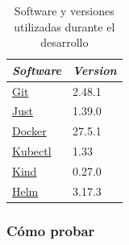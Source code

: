 \begin{table}
  \centering
  \begin{tabular}{|l|l|}
    \hline
    \textit{Software} & \textit{Version} \\ \hline
    \href{https://git-scm.com/book/en/v2/Getting-Started-Installing-Git}{Git} & 2.48.1 \\ \hline
    \href{https://github.com/casey/just?tab=readme-ov-file#installation}{Just} & 1.39.0 \\ \hline
    \href{https://docs.docker.com/desktop/}{Docker} & 27.5.1 \\ \hline
    \href{https://kubernetes.io/docs/tasks/tools/#kubectl}{Kubectl} & 1.33 \\ \hline
    \href{https://kubernetes.io/docs/tasks/tools/#kind}{Kind} & 0.27.0 \\ \hline
    \href{https://helm.sh/docs/intro/install/}{Helm} & 3.17.3 \\ \hline
  \end{tabular}
  \caption{Software y versiones utilizadas durante el desarrollo}
  \label{table:software}
\end{table}

\subsubsection*{Cómo probar}

